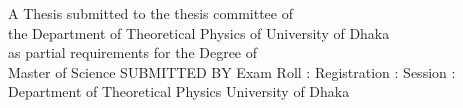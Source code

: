 {\begin{center}
              A Thesis submitted to the thesis committee of \\
              the Department of Theoretical Physics of University of Dhaka \\
              as partial requirements for the Degree of \\
              Master of Science          
              \vfill 
              SUBMITTED BY 
              \vskip 0.3in  %
              Exam Roll : \examrollloc
              \vskip 0.1in  %
              Registration : \regloc
              \vskip 0.1in  %
              Session : \sessionloc
              \vskip 0.1in  %
              Department of Theoretical Physics
              \vskip 0.1in  %
              University of Dhaka
              \vskip 0.1in  %
              \@date 
              \vfill\null 
        \end{center}
} %
\makeatother

\setlength{\parskip}{8pt plus2pt minus2pt}

\setlength{\lineskip}{3.5pt}

\usepackage{setspace}

\usepackage[raggedright, medium]{titlesec}


\usepackage{etoolbox}
\makeatletter
\newif\if@abstractmode

\renewenvironment{titlepage}
{
  \if@twocolumn
  \@restonecoltrue\onecolumn
  \else
  \@restonecolfalse\newpage
  \fi
  \if@abstractmode
  \thispagestyle{plain}%
  \stepcounter{page}%
  \else
  \thispagestyle{empty}%
  \setcounter{page}\@ne%
  \fi
}%
{\if@restonecol\twocolumn \else \newpage \fi
  \if@twoside\else
  \if@abstractmode
  \else
  \setcounter{page}\@ne%
  \fi
  \fi
}

\AtBeginEnvironment{abstract}{%
  \@abstractmodetrue%
}


\usepackage{stackengine,scalerel}

\usepackage{epigraph} 
\usepackage{quotchap} %